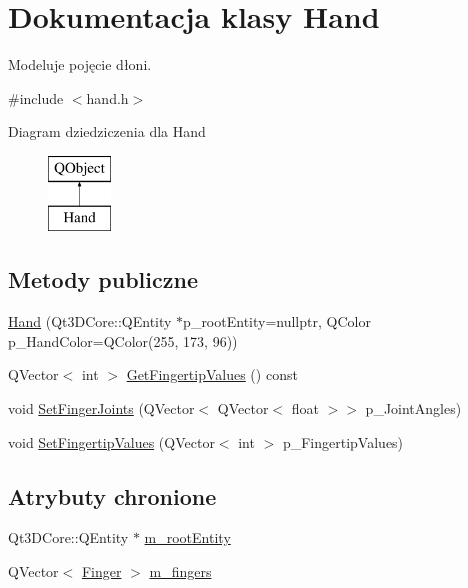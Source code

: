 \hypertarget{class_hand}{}\section{Dokumentacja klasy Hand}
\label{class_hand}


Modeluje pojęcie dłoni.  




{\ttfamily \#include $<$hand.\+h$>$}

Diagram dziedziczenia dla Hand\begin{figure}[H]
\begin{center}
\leavevmode
\includegraphics[height=2.000000cm]{class_hand}
\end{center}
\end{figure}
\subsection*{Metody publiczne}
\begin{DoxyCompactItemize}
\item 
\hyperlink{class_hand_a4a21ef8143e36ab41a5afbd7b292b14c}{Hand} (Qt3\+D\+Core\+::\+Q\+Entity $\ast$p\+\_\+root\+Entity=nullptr, Q\+Color p\+\_\+\+Hand\+Color=Q\+Color(255, 173, 96))
\item 
Q\+Vector$<$ int $>$ \hyperlink{class_hand_ab886f121780eb05a17fdbabd04442d78}{Get\+Fingertip\+Values} () const
\item 
void \hyperlink{class_hand_a52749a0d5baeb2bbd4f133020a5181f1}{Set\+Finger\+Joints} (Q\+Vector$<$ Q\+Vector$<$ float $>$$>$ p\+\_\+\+Joint\+Angles)
\item 
void \hyperlink{class_hand_a6fcc256397062529e6fd41d0554bee06}{Set\+Fingertip\+Values} (Q\+Vector$<$ int $>$ p\+\_\+\+Fingertip\+Values)
\end{DoxyCompactItemize}
\subsection*{Atrybuty chronione}
\begin{DoxyCompactItemize}
\item 
Qt3\+D\+Core\+::\+Q\+Entity $\ast$ \hyperlink{class_hand_a27c80e86783b9066e5aff6b357dc9d78}{m\+\_\+root\+Entity}
\item 
Q\+Vector$<$ \hyperlink{class_finger}{Finger} $>$ \hyperlink{class_hand_a303c056fb939dde0845a69720c15e4f8}{m\+\_\+fingers}
\end{DoxyCompactItemize}


